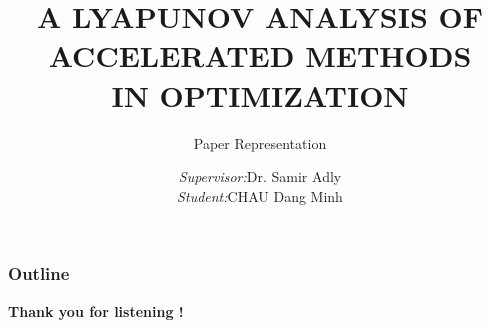 \documentclass[xcolor=dvipsnames, aspectratio=169, 10pt]{beamer}
\title[]{A LYAPUNOV ANALYSIS OF ACCELERATED METHODS \\ IN OPTIMIZATION}
\subtitle{Paper Representation}
\author[Minh]{
		\begin{tabular}{lll}
			\textit{\small Supervisor:} & \small Dr. Samir Adly \\
			\textit{\small Student:} & \small CHAU Dang Minh
            \vspace{.5cm}\\
		\end{tabular}
	}
\institute[Limoges]{
	{
		University of Limoges
	}
}
\begin{document}
\date{}
\begin{frame}
	\titlepage
\end{frame}

\begin{frame}
	\frametitle{Outline}
	\tableofcontents
\end{frame}





\begin{frame}{}
	\begin{center}
		\Huge\textbf{Thank you for listening !}
	\end{center}
\end{frame}
\end{document}
